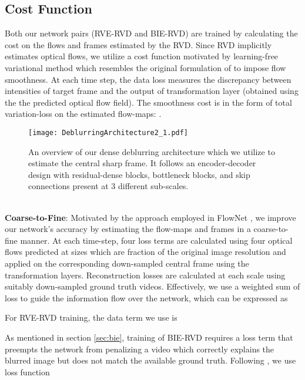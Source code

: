 \documentclass[10pt,twocolumn,letterpaper]{article}
\begin{document}
\subsection{Cost Function}
\label{sec:Cost Function}
Both our network pairs (RVE-RVD and BIE-RVD) are trained by calculating the cost on the flows and frames estimated by the RVD. Since RVD implicitly estimates optical flows, we utilize a cost function motivated by learning-free variational method \cite{brox2011large} which resembles the original formulation of \cite{horn1981determining} to impose flow smoothness. At each time step, the data loss measures the discrepancy between intensities of target frame and the output of transformation layer (obtained using the the predicted optical flow field). The smoothness cost is in the form of total variation-loss on the estimated flow-maps: . 
\\
\begin{figure}
\begin{center}
   \texttt{[image: DeblurringArchitecture2\_1.pdf]}
\end{center}
\vspace{-4mm}
   \caption{An overview of our dense deblurring architecture which we utilize to estimate the central sharp frame. It follows an encoder-decoder design with residual-dense blocks, bottleneck blocks, and skip connections present at 3 different sub-scales.}
\label{fig:SID}
\end{figure}
\\
\textbf{Coarse-to-Fine}:  
Motivated by the approach employed in FlowNet \cite{dosovitskiy2015flownet}, we improve our network's accuracy by estimating the flow-maps and frames in a coarse-to-fine manner. At each time-step, four loss terms are calculated using four optical flows  predicted at sizes which are  fraction of the original image resolution and applied on the corresponding down-sampled central frame using the transformation layers. 
Reconstruction losses are calculated at each scale using suitably down-sampled ground truth videos.  Effectively, we use a weighted sum of loss to guide the information flow over the network, which can be expressed as 


For RVE-RVD training, the data term we use is


As mentioned in section \ref{sec:bie}, training of BIE-RVD requires a loss term that preempts the network from penalizing a video which correctly explains the blurred image but does not match the available ground truth. Following \cite{jin2018learning}, we use loss function
\end{document}
